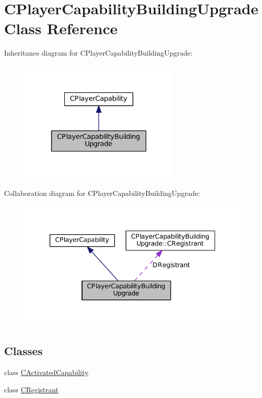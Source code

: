 \hypertarget{classCPlayerCapabilityBuildingUpgrade}{}\section{C\+Player\+Capability\+Building\+Upgrade Class Reference}
\label{classCPlayerCapabilityBuildingUpgrade}


Inheritance diagram for C\+Player\+Capability\+Building\+Upgrade\+:
\nopagebreak
\begin{figure}[H]
\begin{center}
\leavevmode
\includegraphics[width=219pt]{classCPlayerCapabilityBuildingUpgrade__inherit__graph}
\end{center}
\end{figure}


Collaboration diagram for C\+Player\+Capability\+Building\+Upgrade\+:
\nopagebreak
\begin{figure}[H]
\begin{center}
\leavevmode
\includegraphics[width=338pt]{classCPlayerCapabilityBuildingUpgrade__coll__graph}
\end{center}
\end{figure}
\subsection*{Classes}
\begin{DoxyCompactItemize}
\item 
class \hyperlink{classCPlayerCapabilityBuildingUpgrade_1_1CActivatedCapability}{C\+Activated\+Capability}
\item 
class \hyperlink{classCPlayerCapabilityBuildingUpgrade_1_1CRegistrant}{C\+Registrant}
\end{DoxyCompactItemize}
